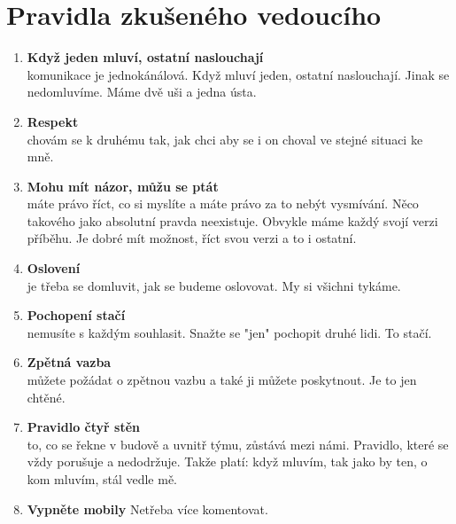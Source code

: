 \documentclass[a4paper,12pt]{report}
\begin{document}
\section{Pravidla zkušeného vedoucího}
\begin{enumerate}
 \item \textbf{Když jeden mluví, ostatní naslouchají} \\
 komunikace je jednokánálová. Když mluví jeden, ostatní naslouchají. Jinak se nedomluvíme. Máme dvě uši a jedna ústa.
 \item \textbf{Respekt}\\
 chovám se k druhému tak, jak chci aby se i on choval ve stejné situaci ke mně.
 \item \textbf{Mohu mít názor, můžu se ptát} \\
 máte právo říct, co si myslíte a máte právo za to nebýt vysmívání. Něco takového jako absolutní pravda neexistuje. Obvykle máme každý svojí verzi příběhu. Je dobré mít možnost, říct svou verzi a to i ostatní.
 \item \textbf{Oslovení}\\
 je třeba se domluvit, jak se budeme oslovovat. My si všichni tykáme. 
 \item \textbf{Pochopení stačí}\\
 nemusíte s každým souhlasit. Snažte se "jen" pochopit druhé lidi. To stačí.
 \item \textbf{Zpětná vazba} \\
 můžete požádat o zpětnou vazbu a také ji můžete poskytnout. Je to jen chtěné.
 \item \textbf{Pravidlo čtyř stěn} \\
 to, co se řekne v budově a uvnitř týmu, zůstává mezi námi. Pravidlo, které se vždy porušuje a nedodržuje. Takže platí: když mluvím, tak jako by ten, o kom mluvím, stál vedle mě.
 \item \textbf{Vypněte mobily} Netřeba více komentovat.
\end{enumerate}
\end{document}
